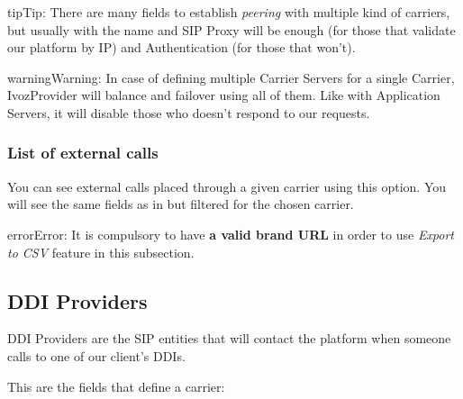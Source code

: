 \documentclass[letterpaper,10pt,english]{sphinxmanual}
\begin{document}
\begin{notice}{tip}{Tip:}
There are many fields to establish \emph{peering} with multiple kind of
carriers, but usually with the name and SIP Proxy will be enough (for
those that validate our platform by IP) and Authentication (for those that
won't).
\end{notice}

\begin{notice}{warning}{Warning:}
In case of defining multiple Carrier Servers for a single
Carrier, IvozProvider will balance and failover using all of them.
Like with Application Servers, it will disable those who doesn't respond to
our requests.
\end{notice}


\subsubsection{List of external calls}
\label{administration_portal/brand/providers/carriers:list-of-external-calls}
You can see external calls placed through a given carrier using this option. You will see the same fields as in
{\hyperref[administration_portal/platform/external_calls:external\string-calls]{}} but filtered for the chosen carrier.

\begin{notice}{error}{Error:}
It is compulsory to have \textbf{a valid brand URL} in order to use \emph{Export to CSV} feature in this subsection.
\end{notice}


\subsection{DDI Providers}
\label{administration_portal/brand/providers/ddi_providers:ddi-providers}\label{administration_portal/brand/providers/ddi_providers::doc}\label{administration_portal/brand/providers/ddi_providers:id1}
DDI Providers are the SIP entities that will contact the platform when someone calls to one of our client's DDIs.

This are the fields that define a carrier:
\end{document}
